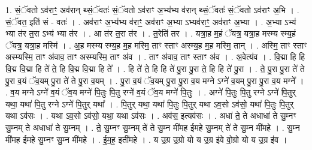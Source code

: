 \documentclass[17pt]{extarticle}
\begin{document}
1. सं॒ॅवतो ऽव॑राꣳ॒॒ अव॑रान् थ्सं॒ॅवतः॑ सं॒ॅवतो ऽव॑राꣳ अ॒भ्य॑भ्य व॑रान् थ्सं॒ॅवतः॑ सं॒ॅवतो ऽव॑राꣳ अ॒भि । . सं॒ॅवत॒ इति॑ सं - वतः॑ । . अव॑राꣳ अ॒भ्य॑भ्य व॑राꣳ॒॒ अव॑राꣳ अ॒भ्या ऽभ्यव॑राꣳ॒॒ अव॑राꣳ अ॒भ्या । . अ॒भ्या ऽभ्य॑ भ्या त॑र त॒रा ऽभ्य॑  भ्या त॑र । . आ त॑र त॒रा त॑र । . त॒रेति॑ तर । . यत्रा॒ह म॒हं ॅयत्र॒ यत्रा॒ह मस्म्य स्म्य॒हं ॅयत्र॒ यत्रा॒ह मस्मि॑ । . अ॒ह मस्म्य स्म्य॒ह म॒ह मस्मि॒ ताꣳ स्ताꣳ अस्म्य॒ह म॒ह मस्मि॒ तान् । . अस्मि॒ ताꣳ स्ताꣳ अस्म्यस्मि॒ ताꣳ अ॑वाव॒ ताꣳ अस्म्यस्मि॒ ताꣳ अ॑व । . ताꣳ अ॑वाव॒ ताꣳ स्ताꣳ अ॑व । . अ॒वेत्य॑व । . वि॒द्मा हि हि वि॒द्म वि॒द्मा हि ते॑ ते॒ हि वि॒द्म वि॒द्मा हि ते᳚ । . हि ते॑ ते॒ हि हि ते॑ पु॒रा पु॒रा ते॒ हि हि ते॑ पु॒रा । . ते॒ पु॒रा पु॒रा ते॑ ते पु॒रा व॒यं ॅव॒यम् पु॒रा ते॑ ते पु॒रा व॒यम् । . पु॒रा व॒यं ॅव॒यम् पु॒रा पु॒रा व॒य मग्ने ऽग्ने॑ व॒यम् पु॒रा पु॒रा व॒य मग्ने᳚ । . व॒य मग्ने ऽग्ने॑ व॒यं ॅव॒य मग्ने॑ पि॒तुः पि॒तु रग्ने॑ व॒यं ॅव॒य मग्ने॑ पि॒तुः । . अग्ने॑ पि॒तुः पि॒तु रग्ने ऽग्ने॑ पि॒तुर् यथा॒ यथा॑ पि॒तु रग्ने ऽग्ने॑ पि॒तुर् यथा᳚ । . पि॒तुर् यथा॒ यथा॑ पि॒तुः पि॒तुर् यथा ऽव॒सो ऽव॑सो॒ यथा॑ पि॒तुः पि॒तुर् यथा ऽव॑सः । . यथा ऽव॒सो ऽव॑सो॒ यथा॒ यथा ऽव॑सः । . अव॑स॒ इत्यव॑सः । . अधा॑ ते॒ ते अधाधा॑ ते सु॒म्नꣳ सु॒म्नम् ते अधाधा॑ ते सु॒म्नम् । . ते॒ सु॒म्नꣳ सु॒म्नम् ते॑ ते सु॒म्न मी॑मह ईमहे सु॒म्नम् ते॑ ते सु॒म्न मी॑महे । . सु॒म्न मी॑मह ईमहे सु॒म्नꣳ सु॒म्न मी॑महे । . ई॒म॒ह॒ इती॑महे । . य उ॒ग्र उ॒ग्रो यो य उ॒ग्र इ॑वे वो॒ग्रो यो य उ॒ग्र इ॑व । \newline
\end{document}
